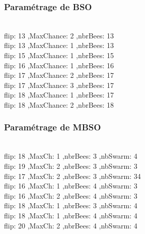\noindent
\begin{minipage}[t]{0.5\textwidth}
\subsubsection{Paramétrage de BSO}
\vspace{-0.5cm}
\textbf{}\\
flip: 13 ,MaxChance: 2 ,nbrBees: 13\\
flip: 13 ,MaxChance: 1 ,nbrBees: 13\\
flip: 15 ,MaxChance: 1 ,nbrBees: 15\\
flip: 16 ,MaxChance: 1 ,nbrBees: 16\\
flip: 17 ,MaxChance: 2 ,nbrBees: 17\\
flip: 17 ,MaxChance: 3 ,nbrBees: 17\\
flip: 18 ,MaxChance: 1 ,nbrBees: 17\\
flip: 18 ,MaxChance: 2 ,nbrBees: 18 
\end{minipage}\hfill
\hspace{0.5cm}
\begin{minipage}[t]{0.6\textwidth}
\subsubsection{Paramétrage de MBSO}
\vspace{-0.5cm}
\textbf{}\\
flip: 18 ,MaxCh: 1 ,nbrBees: 3 ,nbSwarm: 4\\
flip: 19 ,MaxCh: 2 ,nbrBees: 3 ,nbSwarm: 3\\
flip: 17 ,MaxCh: 2 ,nbrBees: 3 ,nbSwarm: 34\\
flip: 16 ,MaxCh: 1 ,nbrBees: 4 ,nbSwarm: 3\\
flip: 16 ,MaxCh: 2 ,nbrBees: 4 ,nbSwarm: 3\\
flip: 18 ,MaxCh: 1 ,nbrBees: 3 ,nbSwarm: 4\\
flip: 18 ,MaxCh: 1 ,nbrBees: 4 ,nbSwarm: 4\\
flip: 20 ,MaxCh: 2 ,nbrBees: 4 ,nbSwarm: 4
\end{minipage}\hfill



\textbf{}


